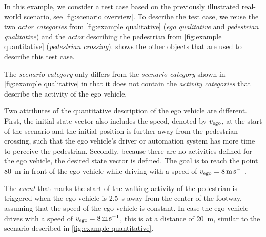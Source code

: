 In this example, we consider a test case based on the previously illustrated real-world scenario, see \cref{fig:scenario overview}. 
\cstarte To describe the test case, we reuse the two \textit{actor categories} from \cref{fig:example qualitative} (\emph{ego qualitative} and \emph{pedestrian qualitative}) and the \textit{actor} describing the pedestrian from \cref{fig:example quantitative} (\emph{pedestrian crossing}). \cende
{} shows the \cstarte other \cende objects that are used to describe this test case. 



The \textit{scenario category} only differs from the \textit{scenario category} shown in \cref{fig:example qualitative} in that it does not contain the \textit{activity categories} that describe the activity of the ego vehicle.

Two attributes of the quantitative description of the ego vehicle are different. First, the initial state vector also includes the speed, denoted by $v_{\mathrm{ego}}$, at the start of the scenario and the initial position is further away from the pedestrian crossing, such that the ego vehicle's driver or automation system has more time to perceive the pedestrian. 
Secondly, because there are no activities defined for the ego vehicle, the desired state vector is defined. The goal is to reach the point \SI{80}{\meter} in front of the ego vehicle while driving with a speed of $v_{\mathrm{ego}}=\SI{8}{\meter\per\second}$.

The \textit{event} that marks the start of the walking activity of the pedestrian is triggered when the ego vehicle is \SI{2.5}{\second} away from the center of the footway, assuming that the speed of the ego vehicle is constant. In case the ego vehicle drives with a speed of $v_{\mathrm{ego}}=\SI{8}{\meter\per\second}$, this is at a distance of \SI{20}{\meter}, similar to the scenario described in \cref{fig:example quantitative}.


